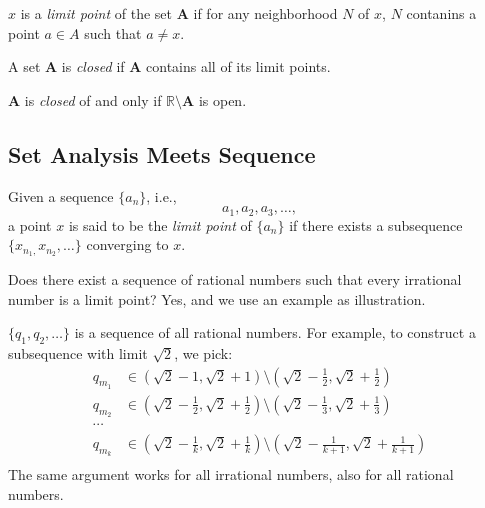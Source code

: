 \begin{definition}
$x$ is a \emph{limit point} of the set $\bm A$ if for any neighborhood $N$ of $x$, $N$ contanins a point $a\in A$ such that $a\ne x$.
\end{definition}

\begin{definition}
A set $\bm A$ is \emph{closed} if $\bm A$ contains all of its limit points.
\end{definition}

\begin{proposition}
$\bm A$ is \emph{closed} of and only if $\mathbb{R}\setminus \bm A$ is open.
\end{proposition}


\subsection{Set Analysis Meets Sequence}
\begin{definition}
Given a sequence $\{a_n\}$, i.e., 
\[
a_1,a_2,a_3,\dots,
\]
a point $x$ is said to be the \emph{limit point} of $\{a_n\}$ if there exists a subsequence $\{x_{n_1,}x_{n_2},\dots\}$ converging to $x$.
\end{definition}
Does there exist a sequence of rational numbers such that  every irrational number is a limit point? Yes, and we use an example as illustration.
\begin{example}
$\{q_1,q_2,\dots\}$ is a sequence of all rational numbers. For example, to construct a subsequence with limit $\sqrt{2}$, we pick:
\begin{align*}
q_{m_1}&\in(\sqrt{2} - 1,\sqrt{2}+1)\setminus (\sqrt{2} - \frac{1}{2},\sqrt{2}+\frac{1}{2})\\
q_{m_2}&\in(\sqrt{2} - \frac{1}{2},\sqrt{2}+\frac{1}{2})\setminus (\sqrt{2} - \frac{1}{3},\sqrt{2}+\frac{1}{3})\\
\cdots\\
q_{m_k}&\in(\sqrt{2} - \frac{1}{k},\sqrt{2}+\frac{1}{k})\setminus (\sqrt{2} - \frac{1}{k+1},\sqrt{2}+\frac{1}{k+1})\\
\end{align*}
The same argument works for all irrational numbers, also for all rational numbers.
\end{example}

